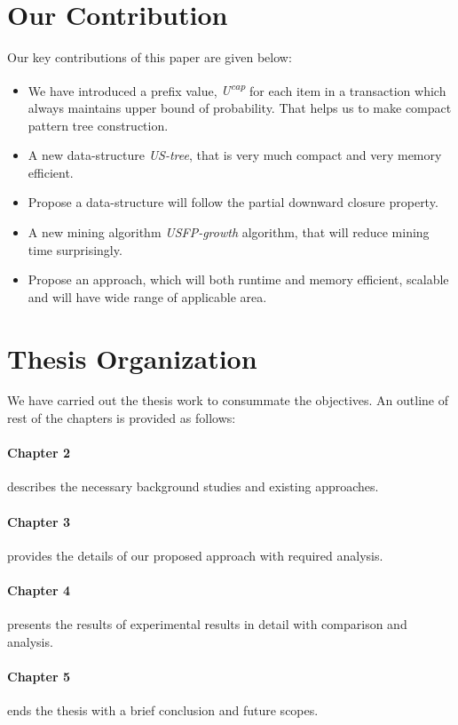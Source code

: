 \section{Our Contribution}
Our key contributions of this paper are given below:
\begin{itemize}
	\item We have introduced a prefix value, \emph{U\textsuperscript{cap}} for each item in a transaction which always maintains upper bound of probability. That helps us to make compact pattern tree construction.
	\item A new data-structure \emph{US-tree}, that is very much compact and very memory efficient.
	\item Propose a data-structure will follow the partial downward closure property.
	\item A new mining algorithm \emph{USFP-growth} algorithm, that will reduce mining time surprisingly.
	\item Propose an approach, which will both runtime and memory efficient, scalable and will have wide range of applicable area.
	\end{itemize}
\section{Thesis Organization}
	We have carried out the thesis work to consummate the objectives. An outline of rest of the chapters is provided as follows:
	\paragraph{Chapter 2} describes the necessary background studies and existing approaches.
	\paragraph{Chapter 3} provides the details of our proposed approach with required analysis.
	\paragraph{Chapter 4} presents the results of experimental results in detail with comparison and analysis.
	\paragraph{Chapter 5} ends the thesis with a brief conclusion and future scopes.
%
